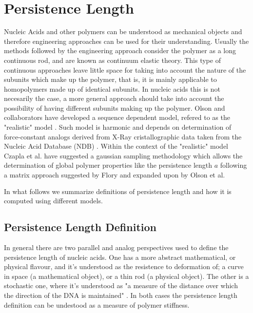 \chapter{Persistence Length}
\label{appendix4a}

Nucleic  Acids and  other  polymers can  be  understood as  mechanical
objects   \cite{marko2003,  nelson2004}   and   therefore  engineering
approaches can  be used for their understanding.   Usually the methods
followed by  the engineering approach  consider the polymer as  a long
continuous rod, and  are known as continuum elastic  theory. This type
of continuous  approaches leave little  space for taking  into account
the nature of  the subunits which make up the polymer,  that is, it is
mainly applicable  to homopolymers made  up of identical  subunits. In
nucleic acids this is not necesarily the case, a more general approach
should take into account  the possibility of having different subunits
making  up the  polymer.   Olson and  collaborators  have developed  a
sequence  dependent  model,  refered   to  as  the  "realistic"  model
\cite{olson1993}.  Such model is harmonic and depends on determination
of  force-constant analogs  derived from  X-Ray  cristallographic data
taken from  the Nucleic Acid Database  (NDB) \cite{go1976, olson1998}.
Within   the  context  of   the  "realistic"   model  Czapla   et  al.
\cite{czapla2006} have suggested a gaussian sampling methodology which
allows  the  determination  of  global  polymer  properties  like  the
persistence length $a$ following  a matrix approach suggested by Flory
\cite{flory1969} and expanded upon  by Olson et al. \cite{maroun1988a,
  marky1994a}

In what follows we summarize definitions of persistence length
and how it is computed using different models.

\section{Persistence Length Definition}
In  general there  are two  parallel and  analog perspectives  used to
define  the persistence  length  of  nucleic acids.   One  has a  more
abstract mathematical, or physical flavour, and it's understood as the
resistence  to  deformation  of;  a  curve in  space  (a  mathematical
object), or a thin rod (a physical object).  The other is a stochastic
one, where  it's understood as "a  measure of the  distance over which
the  direction of  the DNA  is maintained"  \cite{olson1995}.  In both
cases the persistence length definition  can be undestood as a measure
of polymer stiffness.

